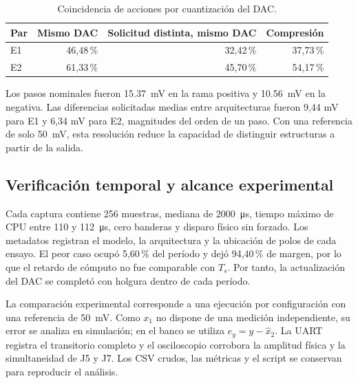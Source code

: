 \begin{table}[t]
\centering
\caption{Coincidencia de acciones por cuantización del DAC.}
\label{tab:cuantizacion}
\small
\begin{tabular}{@{}lrrr@{}}
\toprule
Par & Mismo DAC & Solicitud distinta, mismo DAC & Compresión\\
\midrule
E1 & 46,48\,\% & 32,42\,\% & 37,73\,\%\\
E2 & 61,33\,\% & 45,70\,\% & 54,17\,\%\\
\bottomrule
\end{tabular}
\end{table}

Los pasos nominales fueron \SI{15.37}{\milli\volt} en la rama positiva y
\SI{10.56}{\milli\volt} en la negativa. Las diferencias solicitadas medias
entre arquitecturas fueron 9,44 mV para E1 y 6,34 mV para E2, magnitudes del
orden de un paso. Con una referencia de solo \SI{50}{\milli\volt}, esta
resolución reduce la capacidad de distinguir estructuras a partir de la salida.

\subsection{Verificación temporal y alcance experimental}
Cada captura contiene 256 muestras, mediana de
\SI{2000}{\micro\second}, tiempo máximo de CPU entre 110 y
\SI{112}{\micro\second}, cero banderas y disparo físico sin forzado. Los
metadatos registran el modelo, la arquitectura y la ubicación de polos de cada
ensayo. El peor caso ocupó 5,60\,\% del período y dejó 94,40\,\% de
margen, por lo que el retardo de cómputo no fue comparable con $T_s$. Por tanto,
la actualización del DAC se completó con holgura dentro de cada período.

La comparación experimental corresponde a una ejecución por configuración con
una referencia de \SI{50}{\milli\volt}. Como $x_1$ no dispone de una medición
independiente, su error se analiza en simulación; en el banco se utiliza
$e_y=y-\hat x_2$. La UART registra el transitorio completo y el osciloscopio
corrobora la amplitud física y la simultaneidad de J5 y J7. Los CSV crudos, las
métricas y el script se conservan para reproducir el análisis.
